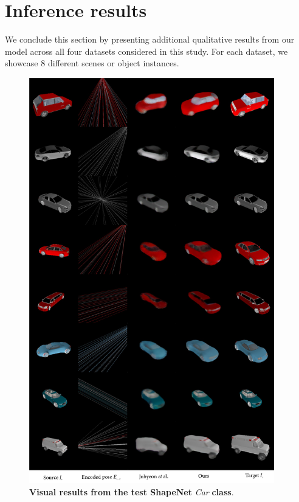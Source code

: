 \section{Inference results}

We conclude this section by presenting additional qualitative results from our model across all four datasets considered in this study. For each dataset, we showcase 8 different scenes or object instances.

\begin{figure}[htp!]
    \begin{center}
    \includegraphics[width=0.95\textwidth]{images/epipolarnvs/SuppMat_Car_New.png}
    \end{center}
     \caption{\textbf{Visual results from the test ShapeNet} \citep{xu2019disn} \textit{Car} \textbf{class}.}     
     \label{fig:add_visCar}
\end{figure}

